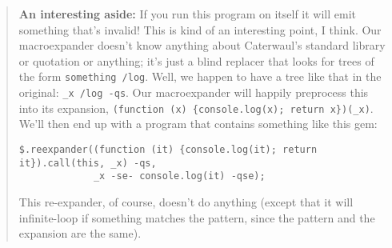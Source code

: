 \documentclass{report}
\begin{document}
\begin{quote}
{\bf An interesting aside:} If you run this program on itself it will emit something that's invalid! This is kind of an interesting point, I think. Our macroexpander doesn't know
anything about Caterwaul's standard library or quotation or anything; it's just a blind replacer that looks for trees of the form {\tt something /log}. Well, we happen to have a tree
like that in the original: \verb|_x /log -qs|. Our macroexpander will happily preprocess this into its expansion, \verb|(function (x) {console.log(x); return x})(_x)|. We'll then end up
with a program that contains something like this gem:

\begin{verbatim}
$.reexpander((function (it) {console.log(it); return it}).call(this, _x) -qs,
             _x -se- console.log(it) -qse);
\end{verbatim}

This re-expander, of course, doesn't do anything (except that it will infinite-loop if something matches the pattern, since the pattern and the expansion are the same).
\end{quote}
\end{document}
